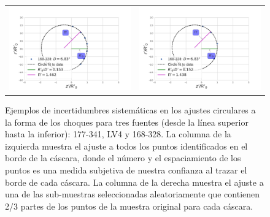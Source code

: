 \begin{figure}
\begin{tabular}{cc}
\includegraphics[clip]{./Programs/LV-bowshocks-xyfancy-positionswill-168-328} &  \includegraphics[clip]{./Programs/Multi-Fit/samp00/LV-bowshocks-xyfancy-positionssamp00-168-328} & 
\end{tabular}
\caption{Ejemplos de incertidumbres sistemáticas en los ajustes circulares a la forma de los choques para tres fuentes (desde la línea superior hasta la inferior): 177-341, LV4 y 168-328. La columna de la izquierda muestra el ajuste a todos los puntos identificados en el borde de la cáscara, donde el número y el espaciamiento de los puntos es una medida subjetiva de nuestra confianza al trazar el borde de cada cáscara. La columna de la derecha muestra el ajuste a una de las sub-muestras seleccionadas aleatoriamente que contienen 2/3 partes de los puntos de la muestra original para cada cáscara.}
\label{fig:char-radii-obs}
\end{figure}

